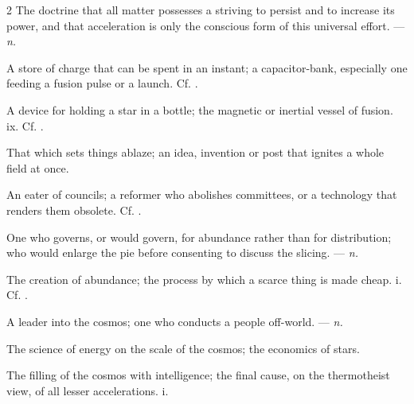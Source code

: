\begin{multicols}{2}
 The doctrine that all matter possesses a striving to persist and to increase its power, and that acceleration is only the conscious form of this universal effort. —  \textit{n.}

 A store of charge that can be spent in an instant; a capacitor-bank, especially one feeding a fusion pulse or a launch. Cf. .

 A device for holding a star in a bottle; the magnetic or inertial vessel of fusion.   ix. Cf. .

 That which sets things ablaze; an idea, invention or post that ignites a whole field at once.  

 An eater of councils; a reformer who abolishes committees, or a technology that renders them obsolete. Cf. .

 One who governs, or would govern, for abundance rather than for distribution; who would enlarge the pie before consenting to discuss the slicing. —  \textit{n.}

 The creation of abundance; the process by which a scarce thing is made cheap.   i. Cf. .

 A leader into the cosmos; one who conducts a people off-world. —  \textit{n.}

 The science of energy on the scale of the cosmos; the economics of stars.

 The filling of the cosmos with intelligence; the final cause, on the thermotheist view, of all lesser accelerations.   i.


\end{multicols}
